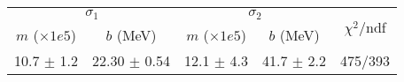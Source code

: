 \begin{tabular}{cc|cc||c}
\multicolumn{2}{c|}{$\sigma_1$} & \multicolumn{2}{|c}{$\sigma_2$}  & \multirow{2}{*}{$\chi^2/$ndf}\\
$m$ ($\times1e5$) & $b$ (MeV) & $m$ ($\times1e5$) & $b$ (MeV)  & \\
\hline
10.7 $\pm$ 1.2 & 22.30 $\pm$ 0.54 & 12.1 $\pm$ 4.3 & 41.7 $\pm$ 2.2 & 475/393\\
\end{tabular}

